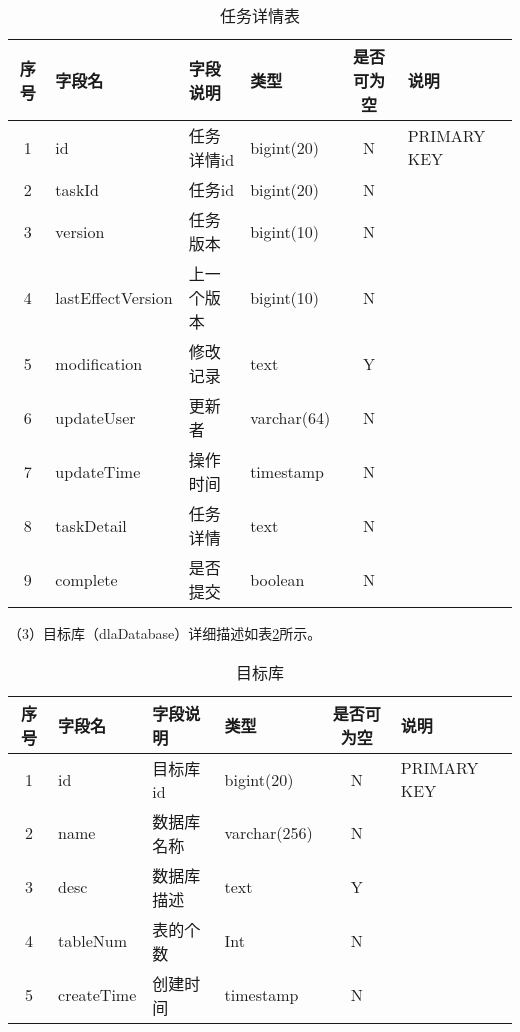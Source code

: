 \begin{table}[H]
  \centering
  \caption{任务详情表}
  \label{tab:任务详情表}
  \begin{tabular}{clllcl}
    \toprule
    序号  & 字段名              & 字段说明     & 类型           & 是否可为空   & 说明  \\
    \midrule
    1    & id                 & 任务详情id   & bigint(20)     & N          & PRIMARY KEY    \\
    2    & taskId             & 任务id      & bigint(20)     & N          &    \\
    3    & version            & 任务版本     & bigint(10)     & N          &   \\
    4    & lastEffectVersion  & 上一个版本   & bigint(10)     & N          &   \\
    5    & modification       & 修改记录     & text           & Y          &   \\
    6    & updateUser         & 更新者       & varchar(64)   & N          &    \\
    7    & updateTime         & 操作时间     & timestamp      & N          &   \\
    8    & taskDetail         & 任务详情     & text           & N          &   \\
    9    & complete           & 是否提交     & boolean        & N          &   \\
    \bottomrule
  \end{tabular}
\end{table}

（3）目标库（dlaDatabase）详细描述如表\ref{tab:目标库}所示。

\begin{table}[H]
  \centering
  \caption{目标库}
  \label{tab:目标库}
  \begin{tabular}{clllcl}
    \toprule
    序号  & 字段名              & 字段说明     & 类型           & 是否可为空   & 说明  \\
    \midrule
    1    & id                 & 目标库id     & bigint(20)    & N          & PRIMARY KEY    \\
    2    & name               & 数据库名称    & varchar(256)  & N          &    \\
    3    & desc               & 数据库描述    & text          & Y          &   \\
    4    & tableNum           & 表的个数      & Int           & N          &   \\
    5    & createTime         & 创建时间      & timestamp     & N          &   \\
    \bottomrule
  \end{tabular}
\end{table}

